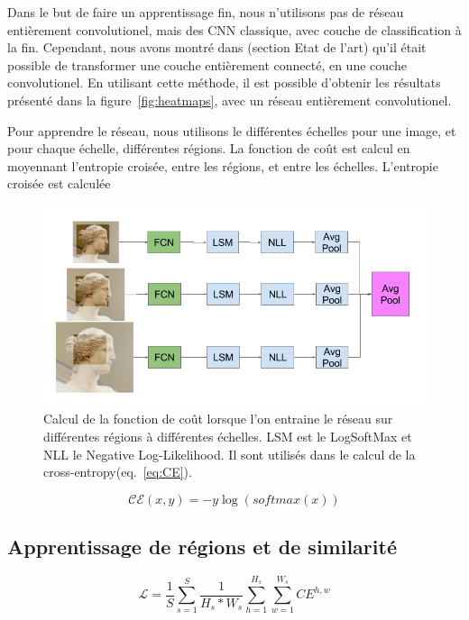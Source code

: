 Dans le but de faire un apprentissage fin, nous n'utilisons pas de réseau entièrement convolutionel, mais des CNN classique, avec couche de classification à la fin. Cependant, nous avons montré dans (section Etat de l'art) qu'il était possible de transformer une couche entièrement connecté, en une couche convolutionel. En utilisant cette méthode, il est possible d'obtenir les résultats présenté dans la figure~\ref{fig:heatmaps}, avec un réseau entièrement convolutionel.

Pour apprendre le réseau, nous utilisons le différentes échelles pour une image, et pour chaque échelle, différentes régions. La fonction de coût est calcul en moyennant l'entropie croisée, entre les régions, et entre les échelles. L'entropie croisée est calculée 


\begin{figure}
\centering
    \includegraphics[width=\linewidth]{figures/Average_Loss.png}
    \caption{Calcul de la fonction de coût lorsque l'on entraine le réseau sur différentes régions à différentes échelles. LSM est le LogSoftMax et NLL le Negative Log-Likelihood. Il sont utilisés dans le calcul de la cross-entropy(eq.~\ref{eq:CE}).
    \label{fig:regionfinetuning}}
\end{figure}


\begin{equation}\label{eq:CE}
	\mathcal{CE}(x,y) = -y \log(softmax(x))
\end{equation}


\subsection{Apprentissage de régions et de similarité}


\begin{equation}\label{eq:fcnloss}
 \mathcal{L} = \frac{1}{S} \sum_{s=1}^S \frac{1}{H_s*W_s}
\sum_{h=1}^{H_s} \sum_{w=1}^{W_s} \mathit{CE}^{h,w}
\end{equation}


